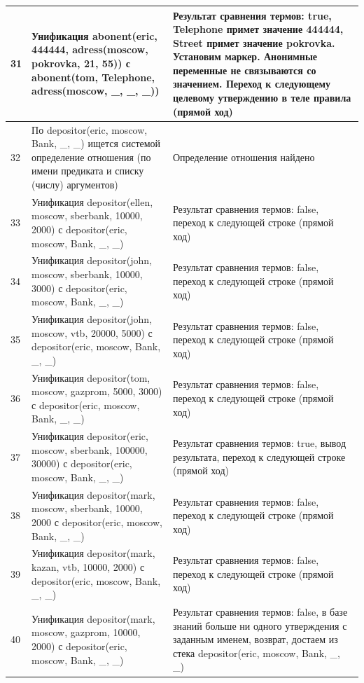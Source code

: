 \documentclass[a4paper,14pt]{extreport} %
\begin{document}
\begin{longtable}{|p{1.1cm}|p{8.5cm}|p{7cm}|}
	31 & Унификация abonent(eric, 444444, adress(moscow, pokrovka, 21, 55)) с abonent(tom, Telephone, adress(moscow, \_, \_, \_)) & Результат сравнения термов: true, Telephone примет значение 444444, Street примет значение pokrovka. Установим маркер.  Анонимные переменные не связываются со значением. Переход к следующему целевому утверждению в теле правила (прямой ход) \\ \hline
	
	32 & По depositor(eric, moscow, Bank, \_, \_) ищется системой определение отношения (по имени предиката и списку (числу) аргументов) & Определение отношения найдено \\ \hline
	33 & Унификация depositor(ellen, moscow, sberbank, 10000, 2000) с depositor(eric, moscow, Bank, \_, \_)& Результат сравнения термов: false, переход к следующей строке (прямой ход) \\ \hline
	34 & Унификация depositor(john, moscow, sberbank, 10000, 3000) с depositor(eric, moscow, Bank, \_, \_) & Результат сравнения термов: false, переход к следующей строке (прямой ход) \\ \hline
	35 & Унификация depositor(john, moscow, vtb, 20000, 5000) с depositor(eric, moscow, Bank, \_, \_) & Результат сравнения термов: false, переход к следующей строке (прямой ход) \\ \hline
	36 & Унификация depositor(tom, moscow, gazprom, 5000, 3000) с depositor(eric, moscow, Bank, \_, \_) & Результат сравнения термов: false, переход к следующей строке (прямой ход)  \\ \hline
	37 & Унификация depositor(eric, moscow, sberbank, 100000, 30000) с depositor(eric, moscow, Bank, \_, \_) & Результат сравнения термов:  true, вывод результата, переход к следующей строке (прямой ход)\\ \hline
	38 & Унификация depositor(mark, moscow, sberbank, 10000, 2000 с depositor(eric, moscow, Bank, \_, \_) & Результат сравнения термов: false, переход к следующей строке (прямой ход) \\ \hline
	39 & Унификация depositor(mark, kazan, vtb, 10000, 2000) с depositor(eric, moscow, Bank, \_, \_) & Результат сравнения термов:  false, переход к следующей строке (прямой ход) \\ \hline
	40 & Унификация depositor(mark, moscow, gazprom, 10000, 2000) с depositor(eric, moscow, Bank, \_, \_) &  Результат сравнения термов: false, в базе знаний больше ни одного утверждения с заданным именем, возврат, достаем из стека depositor(eric, moscow, Bank, \_, \_) \\ \hline
	

\end{longtable}
\end{document}
